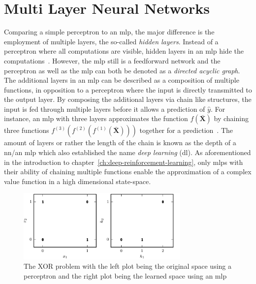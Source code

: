 \documentclass[draft,final]{vutinfth} %
\begin{document}
    \section{Multi Layer Neural Networks}
    Comparing a simple perceptron to an \gls{mlp}, the major difference is the employment of multiple layers, the so-called \textit{hidden layers}.
    Instead of a perceptron where all computations are visible, hidden layers in an \gls{mlp} hide the computations~\citep{aggarwal_neural_2018}.
    However, the \gls{mlp} still is a feedforward network and the perceptron as well as the \gls{mlp} can both be denoted as a \textit{directed acyclic graph}.
    The additional layers in an \gls{mlp} can be described as a composition of multiple functions, in opposition to a perceptron where the input is directly transmitted to the output layer.
    By composing the additional layers via chain like structures, the input is fed through multiple layers before it allows a prediction of $\hat{y}$.
    For instance, an \gls{mlp} with three layers approximates the function $f(\bar{\boldsymbol{X}})$ by chaining three functions $f^{(3)}(f^{(2)}(f^{(1)}(\bar{\boldsymbol{X}})))$ together for a prediction~\citep{goodfellow_deep_2016}.
    The amount of layers or rather the length of the chain is known as the depth of a \gls{nn}/an \gls{mlp} which also established the name \textit{deep learning} (\gls{dl}).
    As aforementioned in the introduction to chapter~\ref{ch:deep-reinforcement-learning}, only \glspl{mlp} with their ability of chaining multiple functions enable the approximation of a complex value function in a high dimensional state-space.

    \begin{figure}[h]
        \vspace{0.5cm}
        \centering
        \includegraphics[width=0.75\textwidth]{figures/xor_problem.png}
        \caption[The XOR problem with the left plot being the original space using a perceptron and the right plot being the learned space using an \gls{mlp}]{The XOR problem with the left plot being the original space using a perceptron and the right plot being the learned space using an \gls{mlp}\protect\footnotemark}
        \label{fig:xor_problem}
    \end{figure}
\end{document}
